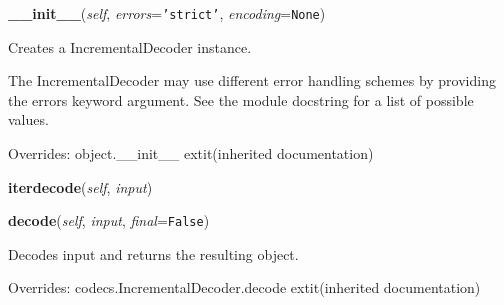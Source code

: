     \vspace{0.5ex}

\hspace{.8\funcindent}\begin{boxedminipage}{\funcwidth}

    \raggedright \textbf{\_\_init\_\_}(\textit{self}, \textit{errors}={\tt \texttt{'}\texttt{strict}\texttt{'}}, \textit{encoding}={\tt None})

\setlength{\parskip}{2ex}
    Creates a IncrementalDecoder instance.

    The IncrementalDecoder may use different error handling schemes by 
    providing the errors keyword argument. See the module docstring for a 
    list of possible values.

\setlength{\parskip}{1ex}
      Overrides: object.\_\_init\_\_ 	extit{(inherited documentation)}

    \end{boxedminipage}

    \label{cssutils:codec:IncrementalDecoder:iterdecode}

    \vspace{0.5ex}

\hspace{.8\funcindent}\begin{boxedminipage}{\funcwidth}

    \raggedright \textbf{iterdecode}(\textit{self}, \textit{input})

\setlength{\parskip}{2ex}
\setlength{\parskip}{1ex}
    \end{boxedminipage}

    \vspace{0.5ex}

\hspace{.8\funcindent}\begin{boxedminipage}{\funcwidth}

    \raggedright \textbf{decode}(\textit{self}, \textit{input}, \textit{final}={\tt False})

\setlength{\parskip}{2ex}
    Decodes input and returns the resulting object.

\setlength{\parskip}{1ex}
      Overrides: codecs.IncrementalDecoder.decode 	extit{(inherited documentation)}

    \end{boxedminipage}

